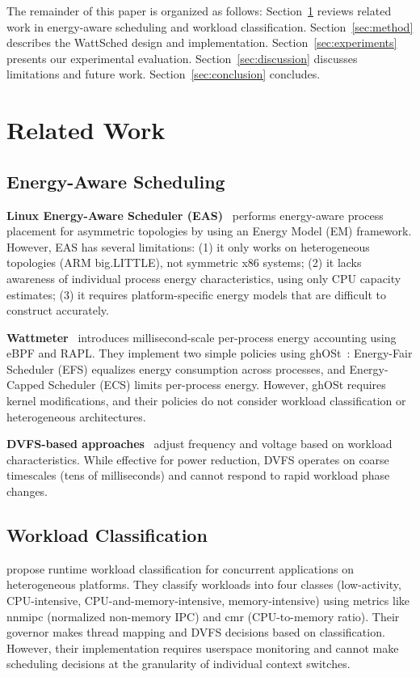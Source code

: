 \documentclass{article}
\begin{document}
The remainder of this paper is organized as follows: Section~\ref{sec:related} reviews related work in energy-aware scheduling and workload classification. Section~\ref{sec:method} describes the WattSched design and implementation. Section~\ref{sec:experiments} presents our experimental evaluation. Section~\ref{sec:discussion} discusses limitations and future work. Section~\ref{sec:conclusion} concludes.

\section{Related Work}
\label{sec:related}

\subsection{Energy-Aware Scheduling}

\textbf{Linux Energy-Aware Scheduler (EAS)}~\citep{arm2019eas} performs energy-aware process placement for asymmetric topologies by using an Energy Model (EM) framework. However, EAS has several limitations: (1) it only works on heterogeneous topologies (ARM big.LITTLE), not symmetric x86 systems; (2) it lacks awareness of individual process energy characteristics, using only CPU capacity estimates; (3) it requires platform-specific energy models that are difficult to construct accurately.

\textbf{Wattmeter}~\citep{qiao2024energy} introduces millisecond-scale per-process energy accounting using eBPF and RAPL. They implement two simple policies using ghOSt~\citep{humphries2021ghost}: Energy-Fair Scheduler (EFS) equalizes energy consumption across processes, and Energy-Capped Scheduler (ECS) limits per-process energy. However, ghOSt requires kernel modifications, and their policies do not consider workload classification or heterogeneous architectures.

\textbf{DVFS-based approaches}~\citep{shafik2020low} adjust frequency and voltage based on workload characteristics. While effective for power reduction, DVFS operates on coarse timescales (tens of milliseconds) and cannot respond to rapid workload phase changes.

\subsection{Workload Classification}

\citet{shafik2020low} propose runtime workload classification for concurrent applications on heterogeneous platforms. They classify workloads into four classes (low-activity, CPU-intensive, CPU-and-memory-intensive, memory-intensive) using metrics like nnmipc (normalized non-memory IPC) and cmr (CPU-to-memory ratio). Their governor makes thread mapping and DVFS decisions based on classification. However, their implementation requires userspace monitoring and cannot make scheduling decisions at the granularity of individual context switches.
\end{document}
